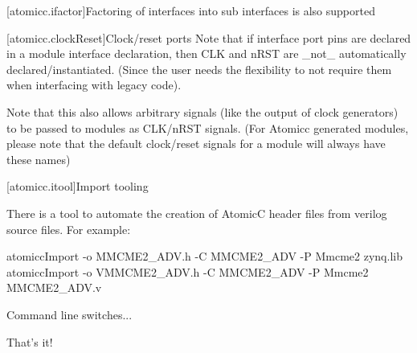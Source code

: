 [atomicc.ifactor]{Factoring of interfaces into sub interfaces is also supported}

[atomicc.clockReset]{Clock/reset ports}
Note that if interface port pins are declared in a module interface declaration, then
CLK and nRST are _not_ automatically declared/instantiated.  (Since the user needs the
flexibility to not require them when interfacing with legacy code).

Note that this also allows arbitrary signals (like the output of clock generators) to be
passed to modules as CLK/nRST signals.  (For Atomicc generated modules, please note that the
default clock/reset signals for a module will always have these names)

[atomicc.itool]{Import tooling}

There is a tool to automate the creation of AtomicC header files from verilog source files.
For example:
\begin{codeblock}
     atomiccImport -o MMCME2_ADV.h -C MMCME2_ADV -P Mmcme2 zynq.lib
     atomiccImport -o VMMCME2_ADV.h -C MMCME2_ADV -P Mmcme2 MMCME2_ADV.v
\end{codeblock}

Command line switches...

That's it!
